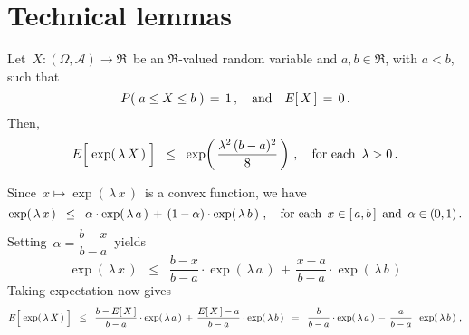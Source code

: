 

\section{Technical lemmas}
\setcounter{theorem}{0}
\setcounter{equation}{0}


\renewcommand{\theenumi}{\roman{enumi}}
\renewcommand{\labelenumi}{\textnormal{(\theenumi)}$\;\;$}


\begin{lemma}
\label{lemma:HoeffdingLemma}
\mbox{}\vskip 0.1cm
\noindent
Let \,$X : (\Omega,\mathcal{A}) \longrightarrow \Re$\, be an
$\Re$-valued random variable and $a,b \in \Re$, with $a < b$, such that
\begin{equation*}
P\!\left(\;a \leq X \leq b\;\right) \,=\, 1\,,
\quad\textnormal{and}\quad
E\!\left[\,X\,\right] \,=\, 0\,.
\end{equation*}
Then,
\begin{equation*}
E\!\left[\;\overset{{\color{white}-}}{\exp}\!\left(\,\lambda\,X\,\right)\;\right]
	\;\; \leq \;\;
	\exp\!\left(\,\dfrac{\lambda^{2}\,(b-a)^{2}}{8}\,\right)\,,
\quad
\textnormal{for each \,$\lambda > 0$}\,.
\end{equation*}
\end{lemma}
\proof
Since \,$x \longmapsto \exp\!\left(\,\lambda\,x\,\right)$\, is a convex function,
we have
\begin{equation*}
\exp\!\left(\,\lambda\,x\,\right)
\;\; \leq \;\;
	\alpha \cdot \exp\!\left(\,\lambda\,a\,\right)
	\, + \,
	(1-\alpha) \cdot \exp\!\left(\,\lambda\,b\,\right)\,,
\quad
\textnormal{for each \,$x \in [\,a,b\,]$\, and \,$\alpha \in (0,1)$}\,.
\end{equation*}
Setting \,$\alpha = \dfrac{b - x}{b - a}$\, yields
\begin{equation*}
\exp\!\left(\,\lambda\,x\,\right)
\;\; \leq \;\;
	\dfrac{b-x}{b-a} \cdot \exp\!\left(\,\lambda\,a\,\right)
	\, + \,
	\dfrac{x-a}{b-a} \cdot \exp\!\left(\,\lambda\,b\,\right)
\end{equation*}
Taking expectation now gives
\begin{equation*}
E\!\left[\;\overset{{\color{white}-}}{\exp}\!\left(\,\lambda\,X\,\right)\;\right]
\;\; \leq \;\;
	\dfrac{b-E\!\left[\,X\,\right]}{b-a} \cdot \exp\!\left(\,\lambda\,a\,\right)
	\, + \,
	\dfrac{E\!\left[\,X\,\right]-a}{b-a} \cdot \exp\!\left(\,\lambda\,b\,\right)
\;\; = \;\;
	\dfrac{b}{b-a} \cdot \exp\!\left(\,\lambda\,a\,\right)
	\, - \,
	\dfrac{a}{b-a} \cdot \exp\!\left(\,\lambda\,b\,\right)\,,
\end{equation*}
